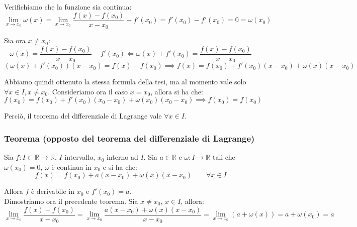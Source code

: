 \documentclass{article}
\begin{document}
\noindent Verifichiamo che la funzione sia continua:
\begin{equation*}
    \lim_{x \to x_0} \omega(x) = \lim_{x \to x_0} \frac{f(x) - f(x_0)}{x - x_0} - f'(x_0) = f'(x_0) - f'(x_0) = 0 = \omega(x_0)
\end{equation*}

\noindent Sia ora $x \neq x_0$:
\begin{equation*}
    \omega(x) = \frac{f(x) - f(x_0)}{x - x_0} - f'(x_0) \iff \omega(x) + f'(x_0) = \frac{f(x) - f(x_0)}{x - x_0}
\end{equation*}
\begin{equation*}
    (\omega(x) + f'(x_0))(x - x_0) = f(x) - f(x_0) \implies f(x) = f(x_0) + f'(x_0)(x - x_0) + \omega(x)(x - x_0)
\end{equation*}

\noindent Abbiamo quindi ottenuto la stessa formula della tesi, ma al momento vale solo $\forall x \in I, x \neq x_0$. Consideriamo ora il caso $x = x_0$, allora si ha che:
\begin{equation*}
    f(x_0) = f(x_0) + f'(x_0)(x_0 - x_0) + \omega(x_0)(x_0 - x_0) \implies f(x_0) = f(x_0)
\end{equation*}

\noindent Perciò, il teorema del differenziale di Lagrange vale $\forall x \in I$.

\subsubsection{Teorema (opposto del teorema del differenziale di Lagrange)}
Sia $f: I \subset \mathbb{R} \xrightarrow{} \mathbb{R}$, $I$ intervallo, $x_0$ interno ad $I$. Sia $a \in \mathbb{R}$ e $\omega: I \xrightarrow{} \mathbb{R}$ tali che $\omega(x_0) = 0$, $\omega$ è continua in $x_0$ e si ha che:
\begin{equation*}
    f(x) = f(x_0) + a(x - x_0) + \omega(x)(x - x_0) \qquad \forall x \in I
\end{equation*}

\noindent Allora $f$ è derivabile in $x_0$ e $f'(x_0) = a$.\\

\noindent Dimostriamo ora il precedente teorema. Sia $x \neq x_0$, $x \in I$, allora:
\begin{equation*}
    \lim_{x \to x_0} \frac{f(x) - f(x_0)}{x - x_0} = \lim_{x \to x_0} \frac{a(x - x_0) + \omega(x)(x - x_0)}{x - x_0} = \lim_{x \to x_0} (a + \omega(x)) = a + \omega(x_0) = a
\end{equation*}
\end{document}

